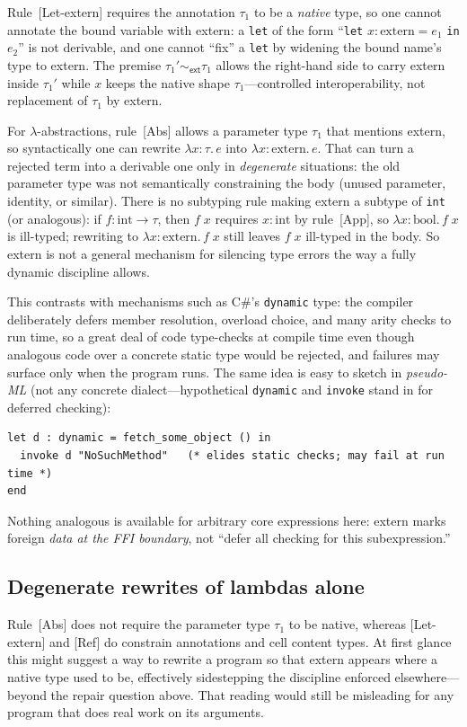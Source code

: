 \documentclass[11pt,a4paper]{article}
\begin{document}
Rule~\textsf{[{Let-extern}]} requires the annotation $\tau_1$ to be a \emph{native} type, so one cannot annotate the bound variable with \textsf{extern}: a \texttt{let} of the form ``\texttt{let} $x:\text{extern} = e_1$ \texttt{in} $e_2$'' is not derivable, and one cannot ``fix'' a \texttt{let} by widening the bound name's type to \textsf{extern}.
The premise $\tau_1' \sim_{\textsf{ext}} \tau_1$ allows the right-hand side to carry \textsf{extern} inside $\tau_1'$ while $x$ keeps the native shape $\tau_1$---controlled interoperability, not replacement of $\tau_1$ by \textsf{extern}.

For $\lambda$-abstractions, rule~\textsf{[Abs]} allows a parameter type $\tau_1$ that mentions \textsf{extern}, so syntactically one can rewrite $\lambda x{:}\tau.\, e$ into $\lambda x{:}\text{extern}.\, e$.
That can turn a rejected term into a derivable one only in \emph{degenerate} situations: the old parameter type was not semantically constraining the body (unused parameter, identity, or similar).
There is no subtyping rule making \textsf{extern} a subtype of \texttt{int} (or analogous): if $f:\text{int}\to\tau$, then $f\;x$ requires $x:\text{int}$ by rule~\textsf{[App]}, so $\lambda x{:}\text{bool}.\, f\;x$ is ill-typed; rewriting to $\lambda x{:}\text{extern}.\, f\;x$ still leaves $f\;x$ ill-typed in the body.
So \textsf{extern} is not a general mechanism for silencing type errors the way a fully dynamic discipline allows.

This contrasts with mechanisms such as C\#'s \texttt{dynamic} type: the compiler deliberately defers member resolution, overload choice, and many arity checks to run time, so a great deal of code type-checks at compile time even though analogous code over a concrete static type would be rejected, and failures may surface only when the program runs.
The same idea is easy to sketch in \emph{pseudo-ML} (not any concrete dialect---hypothetical \texttt{dynamic} and \texttt{invoke} stand in for deferred checking):
\begin{verbatim}
let d : dynamic = fetch_some_object () in
  invoke d "NoSuchMethod"   (* elides static checks; may fail at run time *)
end
\end{verbatim}
Nothing analogous is available for arbitrary core expressions here: \textsf{extern} marks foreign \emph{data at the FFI boundary}, not ``defer all checking for this subexpression.''

\subsection{Degenerate rewrites of lambdas alone}
Rule~\textsf{[Abs]} does not require the parameter type $\tau_1$ to be native, whereas \textsf{[{Let-extern}]} and \textsf{[Ref]} do constrain annotations and cell content types.
At first glance this might suggest a way to rewrite a program so that \textsf{extern} appears where a native type used to be, effectively sidestepping the discipline enforced elsewhere---beyond the repair question above.
That reading would still be misleading for any program that does real work on its arguments.
\end{document}
